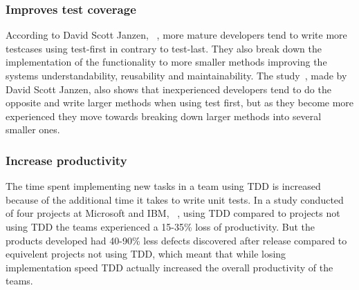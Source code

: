 \subsubsection*{Improves test coverage}
According to David Scott Janzen, ~\cite{janzen}, more mature developers tend to write more testcases using test-first in contrary to test-last. They also break down the implementation of the functionality to more smaller methods improving the systems understandability, reusability and maintainability. The study~\cite{janzen}, made by David Scott Janzen, also shows that inexperienced developers tend to do the opposite and write larger methods when using test first, but as they become more experienced they move towards breaking down larger methods into several smaller ones.

\subsubsection*{Increase productivity}
The time spent implementing new tasks in a team using TDD is increased because of the additional time it takes to write unit tests. In a study conducted of four projects at Microsoft and IBM, ~\cite{microsoftibm}, using TDD compared to projects not using TDD the teams experienced a 15-35\% loss of productivity. But the products developed had 40-90\% less defects discovered after release compared to equivelent projects not using TDD, which meant that while losing implementation speed TDD actually increased the overall productivity of the teams. 
  
%
%




